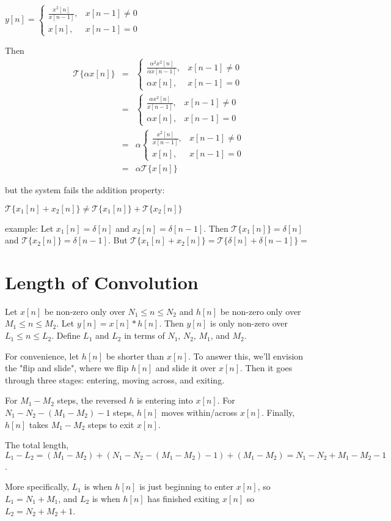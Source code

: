 \documentclass[11pt]{article}
\begin{document}
{\color{blue}
$y[n] = \begin{cases} \frac{x^2[n]}{x[n-1]}, & x[n-1] \neq 0 \\
x[n], & x[n-1] = 0 \end{cases} $

Then 
\begin{eqnarray*}\mathcal{T}\{\alpha x[n]\} &=& \begin{cases} \frac{\alpha^2 x^2[n]}{\alpha x[n-1]}, & x[n-1] \neq 0 \\
\alpha x[n], & x[n-1] = 0 \end{cases}  \\
&=& \begin{cases} \frac{\alpha x^2[n]}{x[n-1]}, & x[n-1] \neq 0 \\
\alpha x[n], & x[n-1] = 0 \end{cases} \\
&=& \alpha \begin{cases} \frac{ x^2[n]}{x[n-1]}, & x[n-1] \neq 0 \\
x[n], & x[n-1] = 0 \end{cases} \\
&=& \alpha \mathcal{T}\{x[n]\}
\end{eqnarray*}

but the system fails the addition property:

$\mathcal{T}\{x_1[n]+x_2[n]\} \neq \mathcal{T}\{x_1[n]\} + \mathcal{T}\{x_2[n]\}$

example: Let $x_1[n] = \delta[n]$ and $x_2[n] = \delta[n-1]$. Then $\mathcal{T}\{x_1[n]\} = \delta[n]$ and $\mathcal{T}\{x_2[n]\} = \delta[n-1]$. But $\mathcal{T}\{x_1[n]+x_2[n]\} = \mathcal{T}\{\delta[n]+\delta[n-1]\} = $

%
}

\section{Length of Convolution}
Let $x[n]$ be non-zero only over $N_1 \leq n \leq N_2$ and $h[n]$ be non-zero only over $M_1 \leq n \leq M_2$. Let $y[n]=x[n]*h[n]$. Then $y[n]$ is only non-zero over $L_1 \leq n \leq L_2$. Define $L_1$ and $L_2$ in terms of $N_1$, $N_2$, $M_1$, and $M_2$.

{\color{blue}
For convenience, let $h[n]$ be shorter than $x[n]$. To answer this, we'll envision the "flip and slide", where we flip $h[n]$ and slide it over $x[n]$. Then it goes through three stages: entering, moving across, and exiting.

For $M_1-M_2$ steps, the reversed $h$ is entering into $x[n]$. For $N_1-N_2-(M_1-M_2)-1$ steps, $h[n]$ moves within/across $x[n]$. Finally, $h[n]$ takes $M_1-M_2$ steps to exit $x[n]$. 

The total length, $L_1-L_2 = (M_1-M_2)+(N_1-N_2-(M_1-M_2)-1) + (M_1-M_2) = N_1-N_2+M_1-M_2-1$.

More specifically, $L_1$ is when $h[n]$ is just beginning to enter $x[n]$, so $L_1 = N_1+M_1$, and $L_2$ is when $h[n]$ has finished exiting $x[n]$ so $L_2=N_2+M_2+1$.

}
\end{document}
